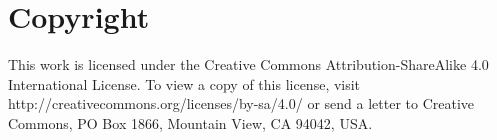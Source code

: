 \chapter{Copyright}

This work is licensed under the Creative Commons Attribution-ShareAlike 4.0 International License. To view a copy of this license, visit http://creativecommons.org/licenses/by-sa/4.0/ or send a letter to Creative Commons, PO Box 1866, Mountain View, CA 94042, USA.

